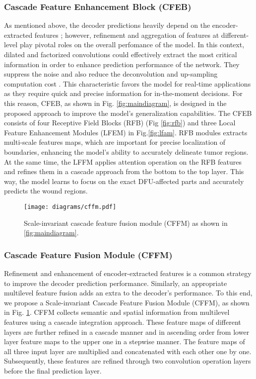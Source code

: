 \documentclass[review]{elsarticle}
\begin{document}
\subsubsection{Cascade Feature Enhancement Block (CFEB)}
As mentioned above, the decoder predictions heavily depend on the encoder-extracted features \cite{bhojanapalli2021understanding}; however, refinement and aggregation of features at different-level play pivotal roles on the overall  perfomance of the model. In this context, dilated and factorized convolutions could effectively extract the most critical information in order to enhance prediction performance of the network. They suppress the noise and also reduce the deconvolution and up-sampling computation cost \cite{bergman2019factorized}. This characteristic favors the model for real-time applications as they require quick and precise information for in-the-moment decisions.
\newline \indent For this reason, CFEB, as shown in Fig. \ref{fig:maindiagram}, is designed in the proposed approach to improve the model's generalization capabilities. The CFEB consists of four Receptive Field Blocks (RFB) (Fig \ref{fig:rfb}) and three Local Feature Enhancement Modules (LFEM) in Fig.\ref{fig:lfam}. RFB modules extracts multi-scale features maps, which are important for precise localization of boundaries, enhancing the model's ability to accurately delineate tumor regions. At the same time, the LFFM applies attention operation on the RFB features and refines them in a cascade approach from the bottom to the top layer. This way, the model learns to focus on the exact DFU-affected parts and accurately predicts the wound regions.

\begin{figure}[h!]
	\texttt{[image: diagrams/cffm.pdf]}
	\caption{Scale-invariant cascade feature fusion module (CFFM) as shown in \ref{fig:maindiagram}. }
	\label{fig:cfem}
\end{figure}

\subsubsection{Cascade Feature Fusion Module (CFFM)}
Refinement and enhancement of encoder-extracted features is a common strategy to improve the decoder prediction performance. Similarly, an appropriate multilevel feature fusion adds an extra to the decoder's performance. To this end, we propose a Scale-invariant Cascade Feature Fusion Module (CFFM), as shown in Fig. \ref{fig:cfem}. CFFM collects semantic and spatial information from multilevel features using a cascade integration approach. These feature maps of different layers are further refined in a cascade manner and in ascending order from lower layer feature maps to the upper one in a stepwise manner. The feature maps of all three input layer are multiplied and concatenated with each other one by one. Subsequently, these features are refined through two convolution operation layers before the final prediction layer.
\end{document}
